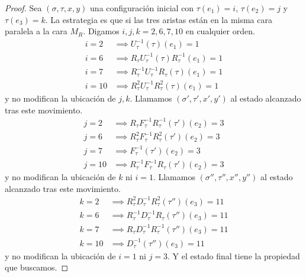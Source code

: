 \documentclass{article}
\theoremstyle{definition}
\begin{document}
\begin{proof}
    Sea $(\sigma,\tau,x,y)$ una configuración inicial con $\tau(e_1)=i$, $\tau(e_2)=j$ y $\tau(e_3)=k$. La estrategia es que si las tres aristas están en la misma cara paralela a la cara $M_R$. Digamos $i,j,k=2,6,7,10$ en cualquier orden.
    \begin{align*}
        i=2  & \implies U^{-1}_\tau(\tau)(e_1)=1                       \\
        i=6  & \implies R_\tau U^{-1}_\tau(\tau)R^{-1}_\tau (e_1)=1    \\
        i=7  & \implies R^{-1}_\tau U^{-1}_\tau R_\tau(\tau) (e_1)=1   \\
        i=10 & \implies R^2_\tau U^{-1}_\tau R^{2}_\tau  (\tau)(e_1)=1
    \end{align*}
    y no modifican la ubicación de $j,k$. Llamamos $(\sigma',\tau',x',y')$ al estado alcanzado tras este movimiento.
    \begin{align*}
        j=2  & \implies R_\tau F^{-1}_\tau R^{-1}_\tau(\tau')(e_2)=3  \\
        j=6  & \implies R_\tau^2 F^{-1}_\tau R^{2}_\tau(\tau')(e_2)=3 \\
        j=7  & \implies F^{-1}_\tau (\tau')(e_2)=3                    \\
        j=10 & \implies R^{-1}_\tau F^{-1}_\tau R_\tau (\tau')(e_2)=3
    \end{align*}
    y no modifican la ubicación de $k$ ni $i=1$. Llamamos $(\sigma'',\tau'',x'',y'')$ al estado alcanzado tras este movimiento.
    \begin{align*}
        k=2  & \implies R^2_\tau D^{-1}_\tau R^2_\tau(\tau'')(e_3)=11   \\
        k=6  & \implies R^{-1}_\tau D^{-1}_\tau R_\tau (\tau'')(e_3)=11 \\
        k=7  & \implies R_\tau D^{-1}_\tau R_\tau^{-1} (\tau'')(e_3)=11 \\
        k=10 & \implies D^{-1}_\tau (\tau'')(e_3)=11
    \end{align*}
    y no modifican la ubicación de $i=1$ ni $j=3$. Y el estado final tiene la propiedad que buscamos.


\end{proof}
\end{document}
